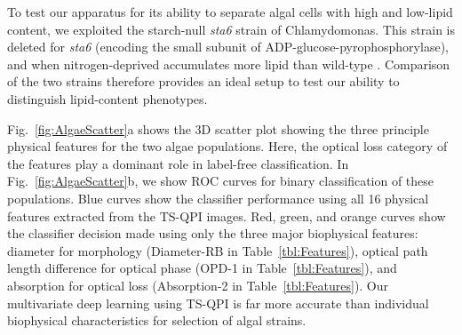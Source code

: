 \documentclass[aps,pra,reprint,longbibliography,superscriptaddress]{revtex4-1}
\begin{document}
To test our apparatus for its ability to separate algal cells with high and low-lipid content, we exploited the starch-null \textit{sta6} strain of Chlamydomonas. This strain is deleted for \textit{sta6} \cite{zabawinski2001starchless} (encoding the small subunit of ADP-glucose-pyrophosphorylase), and when nitrogen-deprived accumulates more lipid than wild-type \cite{work2010increased, li2010chlamydomonas, goodenough2014path, blaby2013systems}. Comparison of the two strains therefore provides an ideal setup to test our ability to distinguish lipid-content phenotypes.

Fig.~\ref{fig:AlgaeScatter}a shows the 3D scatter plot showing the three principle physical features for the two algae populations. Here, the optical loss category of the features play a dominant role in label-free classification. In Fig.~\ref{fig:AlgaeScatter}b, we show ROC curves for binary classification of these populations. Blue curves show the classifier performance using all 16 physical features extracted from the TS-QPI images. Red, green, and orange curves show the classifier decision made using only the three major biophysical features: diameter for morphology (Diameter-RB in Table~\ref{tbl:Features}), optical path length difference for optical phase (OPD-1 in Table~\ref{tbl:Features}), and absorption for optical loss (Absorption-2 in Table~\ref{tbl:Features}). Our multivariate deep learning using TS-QPI is far more accurate than individual biophysical characteristics for selection of algal strains.
\end{document}
